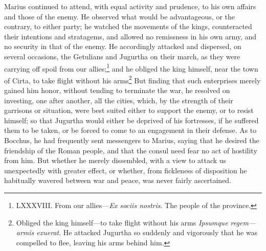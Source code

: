Marius continued to attend, with equal activity and prudence, to his
own affairs and those of the enemy. He observed what would be
advantageous, or the contrary, to either party; he watched the
movements of the kings, counteracted their intentions and stratagems,
and allowed no remissness in his own army, and no security in that of
the enemy. He accordingly attacked and dispersed, on several
occasions, the Getulians and Jugurtha on their march, as they were
carrying off spoil from our allies;\footnote{LXXXVIII. From our allies—\emph{Ex sociis nostris}. The people of the
province.} and he obliged the king
himself, near the town of Cirta, to take flight without his arms\footnote{Obliged the king himself—to take flight without his arms
\emph{Ipsumque regem—armis exuerat}. He attacked Jugurtha so suddenly and
vigorously that he was compelled to flee, leaving his arms behind him.}
But finding that such enterprises merely gained him honor, without
tending to terminate the war, he resolved on investing, one after
another, all the cities, which, by the strength of their garrisons or
situation, were best suited either to support the enemy, or to resist
himself; so that Jugurtha would either be deprived of his fortresses,
if he suffered them to be taken, or be forced to come to an engagement
in their defense. As to Bocchus, he had frequently sent messengers to
Marius, saying that he desired the friendship of the Roman people, and
that the consul need fear no act of hostility from him. But whether he
merely dissembled, with a view to attack us unexpectedly with greater
effect, or whether, from fickleness of disposition he habitually
wavered between war and peace, was never fairly ascertained.

